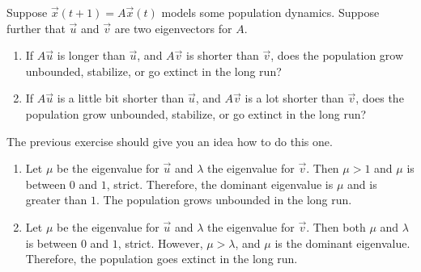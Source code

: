 \documentclass[../main.tex]{subfiles}
\begin{document}
\begin{exercise}
  Suppose \(\vec{x}(t+1) = A \vec{x}(t)\) models some population dynamics. Suppose further that \(\vec{u}\) and \(\vec{v}\) are two eigenvectors for \(A\). 
  \begin{enumerate}
    \item If \(A \vec{u}\) is longer than \(\vec{u}\), and \(A \vec{v}\) is shorter than \(\vec{v}\), does the population grow unbounded, stabilize, or go extinct in the long run?
    \item If \(A \vec{u}\) is a little bit shorter than \(\vec{u}\), and \(A \vec{v}\) is a lot shorter than \(\vec{v}\), does the population grow unbounded, stabilize, or go extinct in the long run?
  \end{enumerate}

  \begin{solution} The previous exercise should give you an idea how to do this one.

    \begin{enumerate}
      \item Let \(\mu\) be the eigenvalue for \(\vec{u}\) and \(\lambda\) the eigenvalue for \(\vec{v}\).  Then \(\mu > 1\) and \(\mu\) is between \(0\) and \(1\), strict.  Therefore, the dominant eigenvalue is \(\mu\) and is greater than \(1\). The population grows unbounded in the long run.
      \item Let \(\mu\) be the eigenvalue for \(\vec{u}\) and \(\lambda\) the eigenvalue for \(\vec{v}\).  Then both \(\mu\)  and \(\lambda\) is between \(0\) and \(1\), strict.  However, \(\mu > \lambda\), and \(\mu\) is the dominant eigenvalue. Therefore, the population goes extinct in the long run.
    \end{enumerate}
  \end{solution}
\end{exercise}
\end{document}
